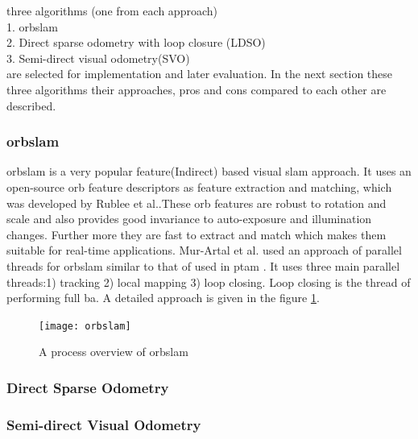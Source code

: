 three algorithms (one from each approach) \\
       1. \acrshort{orb}\acrshort{slam} \cite{Mur-Artal} \\
       2. Direct sparse odometry with loop closure (LDSO)\cite{gao2018ldso} \\
       3. Semi-direct visual odometry(SVO) \cite{7782863}  \\
       
are selected for implementation and later evaluation. In the next section these three algorithms their approaches, pros and cons compared to each other are described.  \\

\subsubsection{\acrshort{orb}\acrshort{slam}}

\acrshort{orb}\acrshort{slam} is a very popular feature(Indirect) based visual \acrshort{slam} approach. It uses an open-source \acrshort{orb} feature descriptors as feature extraction and matching, which was developed by Rublee et al.\cite{6126544}.These \acrshort{orb} features are robust to rotation and scale and also provides good invariance to auto-exposure and illumination changes. Further more they are fast to extract and match which makes them suitable for real-time applications\cite{Mur-Artal}. Mur-Artal et al. \cite{Mur-Artal} used an approach of parallel threads for \acrshort{orb}\acrshort{slam} similar to that of used in \acrshort{ptam} \cite{4538852}. It uses three main parallel threads:1) tracking 2) local mapping 3) loop closing. Loop closing is the thread of performing full \acrshort{ba}. A detailed approach is given in the figure \ref{fig:orbslam}.

\begin{figure}[h]
	\centering
	\texttt{[image: orbslam]}
	\caption{A process overview of \acrshort{orb}\acrshort{slam} \cite{Mur-Artal}}
	\label{fig:orbslam}
\end{figure}


\subsubsection{Direct Sparse Odometry}

\subsubsection{Semi-direct Visual Odometry}




